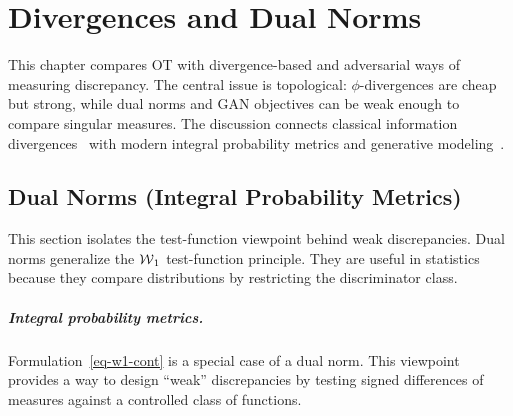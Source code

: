 \chapter{Divergences and Dual Norms}

\label{sec-divergences-dual-norms}


This chapter compares OT with divergence-based and adversarial ways of measuring discrepancy. The central issue is topological: $\phi$-divergences are cheap but strong, while dual norms and GAN objectives can be weak enough to compare singular measures. The discussion connects classical information divergences~\cite{ciszar1967information,ali1966general} with modern integral probability metrics and generative modeling~\cite{sriperumbudur2009integral,GAN,WassersteinGAN}.

\section{Dual Norms (Integral Probability Metrics)}
\label{sec-dual-norms}

This section isolates the test-function viewpoint behind weak discrepancies. Dual norms generalize the $\operatorname{\mathcal{W}}_1$ test-function principle. They are useful in statistics because they compare distributions by restricting the discriminator class.

\paragraph{Integral probability metrics.}

Formulation~\eqref{eq-w1-cont} is a special case of a dual norm. This viewpoint provides a way to design ``weak'' discrepancies by testing signed differences of measures against a controlled class of functions.


